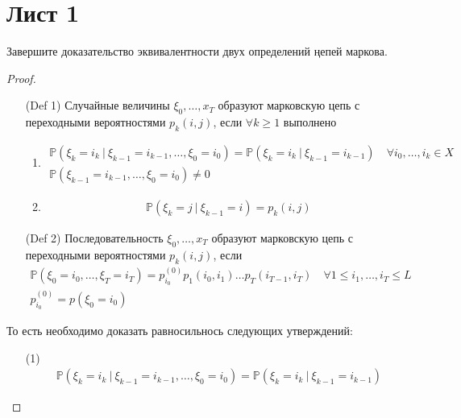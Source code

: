 \section{Лист 1}
    \begin{prob}
        Завершите доказательство эквивалентности двух определений ңепей маркова.
    \end{prob}
    \begin{proof}
        \begin{enumerate}
        \item[(Def 1)] Случайные величины $\xi_0, \ldots, x_T$ образуют марковскую цепь с переходными вероятностями $p_k(i,j)$, если $\forall k \geqslant 1$ выполнено
            \begin{enumerate}
            \item \begin{gather*}
                \mathbb{P}(\xi_k = i_k\ |\ \xi_{k-1} = i_{k-1}, \ldots, \xi_0 = i_0)
                = \mathbb{P}(\xi_k = i_k\ |\ \xi_{k-1} = i_{k-1})
                \quad \forall i_0, \ldots, i_k \in X\\
                \mathbb{P}(\xi_{k-1}=i_{k-1}, \ldots, \xi_0 = i_0) \ne 0
            \end{gather*}
            \item \begin{gather*}
                \mathbb{P}(\xi_k = j\ |\ \xi_{k-1}=i) = p_{k}(i,j)
            \end{gather*}
            \end{enumerate}
        \item[(Def 2)] Последовательность $\xi_0, \ldots, x_T$ образуют марковскую цепь с переходными вероятностями $p_k(i,j)$, если
            \begin{gather*}
                \mathbb{P}(\xi_0 = i_0, \ldots, \xi_T = i_T)
                = p^{(0)}_{i_{0}} p_1(i_0, i_1) \ldots p_T(i_{T-1}, i_T)
                \quad \forall 1 \leqslant i_1, \ldots, i_T \leqslant L\\
                p_{i_0}^{(0)} = p(\xi_0 = i_0)
            \end{gather*}
        \end{enumerate}
        То есть необходимо доказать равносильнось следующих утверждений:
        \begin{enumerate}
        \item[(1)]
            \begin{gather*}
                \mathbb{P}(\xi_k = i_k\ |\ \xi_{k-1}=i_{k-1}, \ldots, \xi_0 = i_0)
                = \mathbb{P}(\xi_k = i_k\ |\ \xi_{k-1} = i_{k-1})

\end{gather*}
\end{enumerate}
\end{proof}

